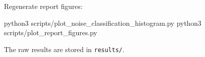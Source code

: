 \documentclass[
]{article}
\newenvironment{Shaded}{\begin{snugshade}}{\end{snugshade}}
\newcommand{\ExtensionTok}[1]{#1}
\newcommand{\NormalTok}[1]{#1}
\begin{document}
Regenerate report figures:

\begin{Shaded}
\begin{Highlighting}[]
\ExtensionTok{python3}\NormalTok{ scripts/plot\_noise\_classification\_histogram.py}
\ExtensionTok{python3}\NormalTok{ scripts/plot\_report\_figures.py}
\end{Highlighting}
\end{Shaded}

The raw results are stored in \texttt{results/}.
\end{document}
